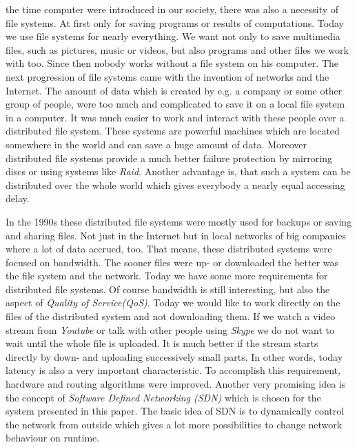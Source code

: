  the time computer were introduced in our society, there was also a necessity of file systems. At first only for saving programs or results of computations. Today we use file systems for nearly everything. We want not only to save multimedia files, such as pictures, music or videos, but also programs and other files we work with too. Since then nobody works without a file system on his computer. The next progression of file systems came with the invention of networks and the Internet. The amount of data which is created by e.g. a company or some other group of people, were too much and complicated to save it on a local file system in a computer. It was much easier to work and interact with these people over a distributed file system. These systems are powerful machines which are located somewhere in the world and can save a huge amount of data. Moreover distributed file systems provide a much better failure protection by mirroring discs or using systems like \textit{Raid}. Another advantage is, that such a system can be distributed over the whole world which gives everybody a nearly equal accessing delay.

In the 1990s these distributed file systems were mostly used for backups or saving and sharing files. Not just in the Internet but in local networks of big companies where a lot of data accrued, too. That means, these distributed systems were focused on bandwidth. The sooner files were up- or downloaded the better was the file system and the network. Today we have some more requirements for distributed file systems. Of course bandwidth is still interesting, but also the aspect of \textit{Quality of Service(QoS)}. Today we would like to work directly on the files of the distributed system and not downloading them. If we watch a video stream from \textit{Youtube} or talk with other people using \textit{Skype} we do not want to wait until the whole file is uploaded. It is much better if the stream starts directly by down- and uploading successively small parts. In other words, today latency is also a very important characteristic. To accomplish this requirement, hardware and routing algorithms were improved. Another very promising idea is the concept of \textit{Software Defined Networking (SDN)} which is chosen for the system presented in this paper. The basic idea of SDN is to dynamically control the network from outside which gives a lot more possibilities to change network behaviour on runtime.

